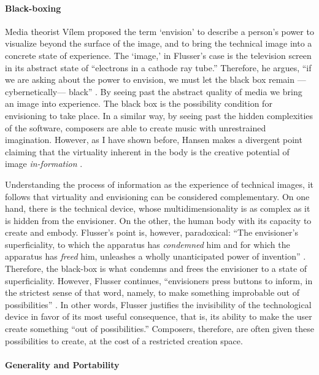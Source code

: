 	\paragraph{Black-boxing}

	Media theorist Vílem \textcite{Flu11:Int} proposed the term `envision' to describe a person's power to visualize beyond the surface of the image, and to bring the technical image into a concrete state of experience. The `image,' in Flusser's case is the television screen in its abstract state of ``electrons in a cathode ray tube.'' Therefore, he argues, ``if we are asking about the power to envision, we must let the black box remain ---cybernetically--- black'' \parencite[35]{Flu11:Int}. By seeing past the abstract quality of media we bring an image into experience. The black box is the possibility condition for envisioning to take place. In a similar way, by seeing past the hidden complexities of the software, composers are able to create music with unrestrained imagination. However, as I have shown before, Hansen makes a divergent point claiming that the virtuality inherent in the body is the creative potential of image \textit{in-formation} . 

	Understanding the process of information as the experience of technical images, it follows that virtuality and envisioning can be considered complementary. On one hand, there is the technical device, whose multidimensionality is as complex as it is hidden from the envisioner. On the other, the human body with its capacity to create and embody. Flusser's point is, however, paradoxical: ``The envisioner's superficiality, to which the apparatus has \textit{condemned} him and for which the apparatus has \textit{freed} him, unleashes a wholly unanticipated power of invention'' \im \parencite[37]{Flu11:Int}. Therefore, the black-box is what condemns and frees the envisioner to a state of superficiality. However, Flusser continues, ``envisioners press buttons to inform, in the strictest sense of that word, namely, to make something improbable out of possibilities'' \parencite[37]{Flu11:Int}. In other words, Flusser justifies the invisibility of the technological device in favor of its most useful consequence, that is, its ability to make the user create something ``out of possibilities.'' Composers, therefore, are often given these possibilities to create, at the cost of a restricted creation space.

	\paragraph{Generality and Portability}
	\label{computer:free}

